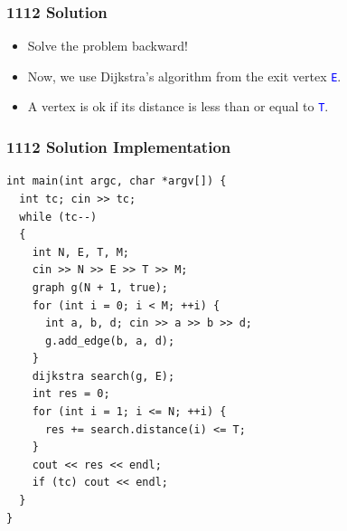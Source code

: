 \documentclass{beamer}
\begin{document}
\ifanswers

\begin{frame}%
\frametitle{1112 Solution}


\footnotesize

\begin{itemize}

\item Solve the problem backward!


\item<3-> Now, we use Dijkstra's algorithm from the exit vertex \textcolor{blue}{\texttt{E}}.

\item<4-> A vertex is ok if its distance is less than or equal to \textcolor{blue}{\texttt{T}}.

\end{itemize}

\end{frame}


\begin{frame}[containsverbatim]
\frametitle{1112 Solution Implementation}
\scriptsize
\begin{lstlisting}
int main(int argc, char *argv[]) {
  int tc; cin >> tc;
  while (tc--)
  {
    int N, E, T, M;
    cin >> N >> E >> T >> M;
    graph g(N + 1, true);
    for (int i = 0; i < M; ++i) {
      int a, b, d; cin >> a >> b >> d;
      g.add_edge(b, a, d);
    }
    dijkstra search(g, E);
    int res = 0;
    for (int i = 1; i <= N; ++i) {
      res += search.distance(i) <= T;
    }
    cout << res << endl;
    if (tc) cout << endl;
  }
}
\end{lstlisting}

\end{frame}
\end{document}
